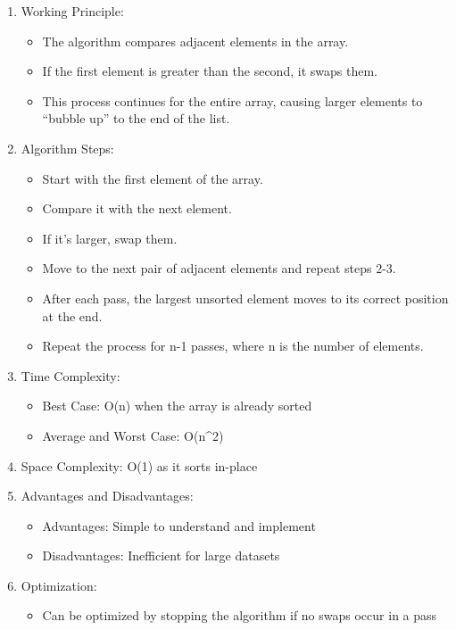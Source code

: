 \begin{enumerate}
\def\labelenumi{\arabic{enumi}.}
\item
  Working Principle:

  \begin{itemize}
  \tightlist
  \item
    The algorithm compares adjacent elements in the array.
  \item
    If the first element is greater than the second, it swaps them.
  \item
    This process continues for the entire array, causing larger elements
    to ``bubble up'' to the end of the list.
  \end{itemize}
\item
  Algorithm Steps:

  \begin{itemize}
  \tightlist
  \item
    Start with the first element of the array.
  \item
    Compare it with the next element.
  \item
    If it's larger, swap them.
  \item
    Move to the next pair of adjacent elements and repeat steps 2-3.
  \item
    After each pass, the largest unsorted element moves to its correct
    position at the end.
  \item
    Repeat the process for n-1 passes, where n is the number of
    elements.
  \end{itemize}
\item
  Time Complexity:

  \begin{itemize}
  \tightlist
  \item
    Best Case: O(n) when the array is already sorted
  \item
    Average and Worst Case: O(n\^{}2)
  \end{itemize}
\item
  Space Complexity: O(1) as it sorts in-place
\item
  Advantages and Disadvantages:

  \begin{itemize}
  \tightlist
  \item
    Advantages: Simple to understand and implement
  \item
    Disadvantages: Inefficient for large datasets
  \end{itemize}
\item
  Optimization:

  \begin{itemize}
  \tightlist
  \item
    Can be optimized by stopping the algorithm if no swaps occur in a
    pass
  \end{itemize}
\end{enumerate}

